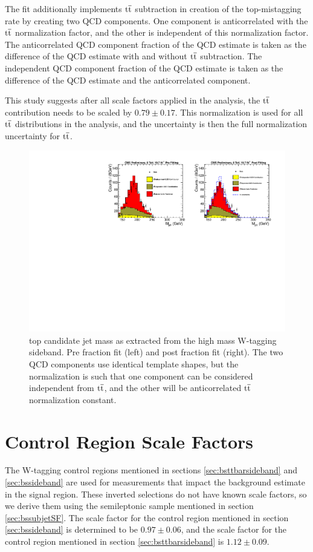 The fit additionally implements $\mathrm{t\overline{t}}$ subtraction in creation of the top-mistagging rate by creating two QCD components.  One component is anticorrelated 
with the $\mathrm{t\overline{t}}$ normalization factor, and the other is independent of this normalization factor.  The anticorrelated QCD component fraction of the QCD estimate 
is taken as the difference of the QCD estimate with and without $\mathrm{t\overline{t}}$ subtraction.  The independent QCD component fraction of the QCD estimate is taken as the 
difference of the QCD estimate and the anticorrelated component.  

This study suggests after all scale factors applied in the analysis, the $\mathrm{t\overline{t}}$ contribution needs to be scaled by $0.79 \pm 0.17$.  
This normalization is used for all $\mathrm{t\overline{t}}$ distributions in the analysis, and the uncertainty is then the full normalization uncertainty for $\mathrm{t\overline{t}}$.

\begin{figure}[htcb]
\centering
\includegraphics[width=1.0\textwidth]{AN-14-049/figs/ttbarfittingfromtheta.pdf}
\caption{top candidate jet mass as extracted from the high mass W-tagging sideband.  Pre fraction fit (left) and post fraction fit (right).  The two QCD components use identical template shapes,
but the normalization is such that one component can be considered independent from $\mathrm{t\overline{t}}$, and the other will be anticorrelated $\mathrm{t\overline{t}}$ normalization constant. }
\label{figs:bsttbarfit}
\end{figure}

\section{Control Region Scale Factors}
\label{sec:bsCRSF}
The W-tagging control regions mentioned in sections \ref{sec:bsttbarsideband} and \ref{sec:bssideband} are used for measurements that impact the background estimate in the signal region.  
These  inverted selections do not have known scale factors, so we derive them using the semileptonic sample mentioned in section \ref{sec:bssubjetSF}.  The scale factor for the control region mentioned in 
section \ref{sec:bssideband} is determined to be $0.97 \pm 0.06$, and the scale factor for the control region mentioned in section \ref{sec:bsttbarsideband} is $1.12 \pm 0.09$.  

